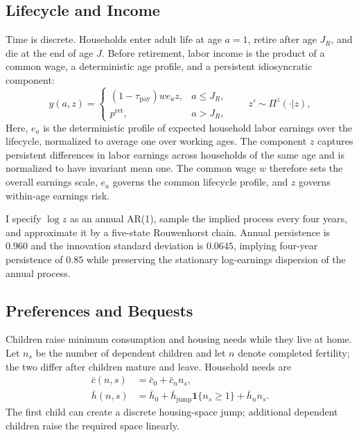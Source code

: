 \documentclass[11pt]{article}
\theoremstyle{definition}
\newcommand{\1}{\mathbf 1}
\begin{document}
\subsection{Lifecycle and Income}
Time is discrete. Households enter adult life at age $a=1$, retire after age
$J_R$, and die at the end of age $J$. Before retirement, labor income is the
product of a common wage, a deterministic age profile, and a persistent
idiosyncratic component:
\begin{equation}
y(a,z)=
\begin{cases}
(1-\tau_{\mathrm{pay}})w e_a z, & a\le J_R,\\
p^{\mathrm{ret}}, & a>J_R,
\end{cases}
\qquad
z'\sim \Pi^z(\cdot|z),
\label{eq:quant_income}
\end{equation}
Here, $e_a$ is the deterministic profile of expected household labor earnings
over the lifecycle, normalized to average one over working ages. The component
$z$ captures persistent differences in labor earnings across households of the
same age and is normalized to have invariant mean one. The common wage $w$
therefore sets the overall earnings scale, $e_a$ governs the common lifecycle
profile, and $z$ governs within-age earnings risk.

I specify $\log z$ as an annual AR(1), sample the implied process every four
years, and approximate it by a five-state Rouwenhorst chain. Annual persistence
is $0.960$ and the innovation standard deviation is $0.0645$, implying
four-year persistence of $0.85$ while preserving the stationary log-earnings
dispersion of the annual process.

\subsection{Preferences and Bequests}

Children raise minimum consumption and housing needs while they live at home.
Let $n_s$ be the number of dependent children and let $n$ denote completed fertility;
the two differ after children mature and leave. Household needs are
\begin{equation}
\begin{aligned}
\bar c(n,s)&=\bar c_0+\bar c_n n_s,\\
\bar h(n,s)&=\bar h_0
+\bar h_{\mathrm{jump}}\1\{n_s\ge1\}
+\bar h_n n_s.
\end{aligned}
\label{eq:quant_child_needs}
\end{equation}
The first child can create a discrete housing-space jump; additional dependent
children raise the required space linearly.
\end{document}
